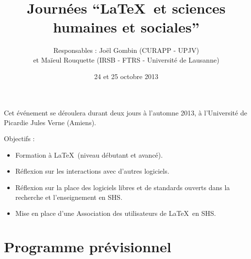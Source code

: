 \documentclass[11pt]{article}
\begin{document}
\title{Journées \enquote{\LaTeX\ et sciences humaines et sociales}}
\author{Responsables : Joël Gombin (CURAPP - UPJV) \\ et Maïeul Rouquette (IRSB - FTRS - Université de Lausanne)}
\date{24 et 25 octobre 2013}
\maketitle


Cet événement se déroulera durant deux jours à l'automne 2013, à l'Université de Picardie Jules Verne (Amiens). 

\vspace{12pt}


Objectifs :
\begin{itemize}
\item Formation à \LaTeX\ (niveau débutant et avancé).
\item Réflexion sur les interactions avec d'autres logiciels.
\item Réflexion sur la place des logiciels libres et de standards ouverts dans la recherche et l'enseignement en SHS.
\item Mise en place d'une Association des utilisateurs de \LaTeX\ en SHS.
\end{itemize}

\section{Programme prévisionnel}
\end{document}
